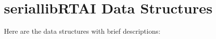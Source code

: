 \section{seriallib\-RTAI Data Structures}
Here are the data structures with brief descriptions:\begin{CompactList}
\item{}
\end{CompactList}
